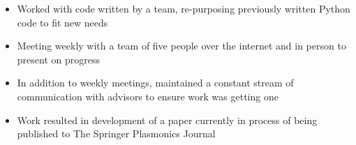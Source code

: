 \documentclass[10pt,a4paper,ragged2e]{altacv}
\begin{document}

\begin{fullwidth}
\makecvheader
\end{fullwidth}



\begin{itemize}
\item Worked with code written by a team, re-purposing previously written Python code to fit new needs
\item Meeting weekly with a team of five people over the internet and in person to present on progress
\item In addition to weekly meetings, maintained a constant stream of communication with advisors to ensure work was getting one
\smallskip
\item Work resulted in development of a paper currently in process of being published to The Springer Plasmonics Journal
\end{itemize}
\end{document}
